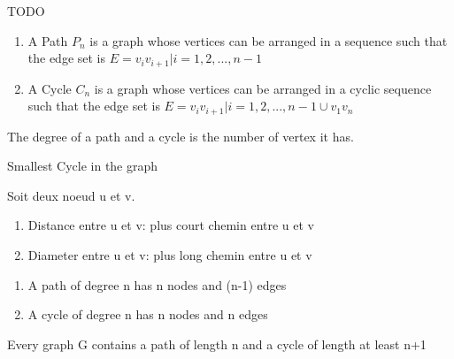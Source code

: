 \documentclass{article}
\begin{document}
\begin{definition}[Circuit]
    TODO
\end{definition}

\begin{definition}
    \begin{enumerate}
        \item A Path $P_n$ is a graph whose vertices can be arranged
	    in a sequence such that the edge set is
	    $ E = {v_i v_{i+1} | i = 1,2,...,n-1} $
	\item A Cycle $C_n$ is a graph whose vertices can be arranged in
	    a cyclic sequence such that the edge set is
	    $ E = {v_i v_{i+1} | i = 1,2,...,n-1} \cup{v_1v_n}$
    \end{enumerate}
\end{definition}

\begin{definition}
    The degree of a path and a cycle is the number of vertex it has.
\end{definition}

\begin{definition}[Girth]
    Smallest Cycle in the graph
\end{definition}

\begin{definition}
    Soit deux noeud u et v.
    \begin{enumerate}
        \item Distance entre u et v: plus court chemin entre u et v
	\item Diameter entre u et v: plus long chemin entre u et v
    \end{enumerate}
\end{definition}

\begin{theorem}
    \begin{enumerate}
	\item A path of degree n has n nodes and (n-1) edges
	\item A cycle of degree n has n nodes and n edges
    \end{enumerate}
\end{theorem}

\begin{proposition}
    Every graph G contains a path of length n and a cycle of length
    at least n+1
\end{proposition}
\end{document}
